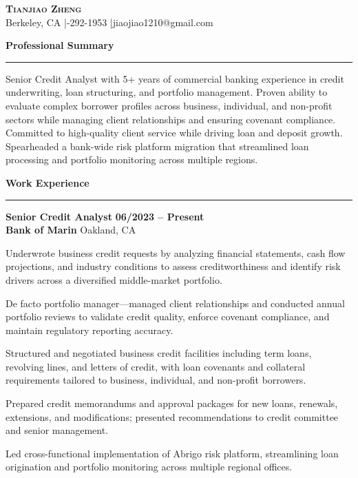 \documentclass[letterpaper,11pt]{article}
\renewcommand{\section}[1]{%
  \vspace{5pt}%
  {\large\bfseries\color{sectionblue}#1}\\[-6pt]%
  {\color{sectionblue}\rule{\textwidth}{0.8pt}}%
  \vspace{1pt}%
}
\renewenvironment{itemize}{%
  \begin{list}{\textbullet}{%
    \setlength{\leftmargin}{1.5em}%
    \setlength{\itemsep}{1pt}%
    \setlength{\parsep}{0pt}%
    \setlength{\topsep}{1pt}%
    \setlength{\partopsep}{0pt}%
  }%
}{\end{list}}
\begin{document}
\begin{center}
{\LARGE\textsc{\textbf{Tianjiao Zheng}}}\\[2pt]
Berkeley, CA \enspace|-292-1953 \enspace|\enspace jiaojiao1210@gmail.com
\end{center}

\section{Professional Summary}

Senior Credit Analyst with 5+ years of commercial banking experience in credit underwriting, loan structuring, and portfolio management. Proven ability to evaluate complex borrower profiles across business, individual, and non-profit sectors while managing client relationships and ensuring covenant compliance. Committed to high-quality client service while driving loan and deposit growth. Spearheaded a bank-wide risk platform migration that streamlined loan processing and portfolio monitoring across multiple regions.

\section{Work Experience}

\textbf{Senior Credit Analyst} \hfill \textbf{06/2023 -- Present}\\
\textbf{Bank of Marin} \hfill Oakland, CA
\begin{itemize}
  \item Underwrote business credit requests by analyzing financial statements, cash flow projections, and industry conditions to assess creditworthiness and identify risk drivers across a diversified middle-market portfolio.
  \item De facto portfolio manager---managed client relationships and conducted annual portfolio reviews to validate credit quality, enforce covenant compliance, and maintain regulatory reporting accuracy.
  \item Structured and negotiated business credit facilities including term loans, revolving lines, and letters of credit, with loan covenants and collateral requirements tailored to business, individual, and non-profit borrowers.
  \item Prepared credit memorandums and approval packages for new loans, renewals, extensions, and modifications; presented recommendations to credit committee and senior management.
  \item Led cross-functional implementation of Abrigo risk platform, streamlining loan origination and portfolio monitoring across multiple regional offices.
\end{itemize}
\end{document}
